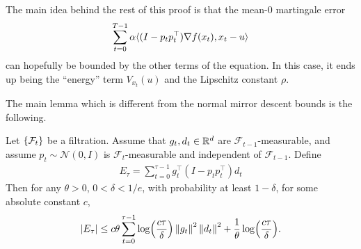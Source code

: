     The main idea behind the rest of this proof is that the mean-0 martingale error
    \begin{align*}
        \sum_{t=0}^{T-1} \alpha \langle (I-p_tp_t^\top) \nabla f(x_t), x_t-u \rangle
    \end{align*}
    can hopefully be bounded by the other terms of the equation. In this case, it ends up being the ``energy'' term $V_{x_t}(u)$ and the Lipschitz constant $\rho$. 


    The main lemma which is different from the normal mirror descent bounds is the following.
    \begin{lemma}
        \label{lem:concentration_bounds}
    Let $\left\{\mathcal F_t\right\}$ be a filtration. Assume that $g_t,d_t \in \mathbb{R}^d$ are $\mathcal F_{t-1}$-measurable, and assume $p_t \sim \mathcal N(0,I)$ is $\mathcal F_t$-measurable and independent of $\mathcal F_{t-1}$. Define
    \begin{align*}
        E_\tau = \sum_{t=0}^{\tau-1} g_t^\top (I-p_tp_t^\top) d_t
    \end{align*}
    Then for any $\theta > 0$, $0 < \delta < 1/e$, with probability at least $1-\delta$, for some absolute constant $c$,
    \begin{align*}
        |E_\tau| \leq c\theta \sum_{t=0}^{\tau-1} \log(\frac{c\tau}{\delta}) \left\lVert g_t \right\rVert^2 \left\lVert d_t \right\rVert^2 + \frac1\theta \log(\frac {c\tau}{\delta}).
    \end{align*}
    \end{lemma}

